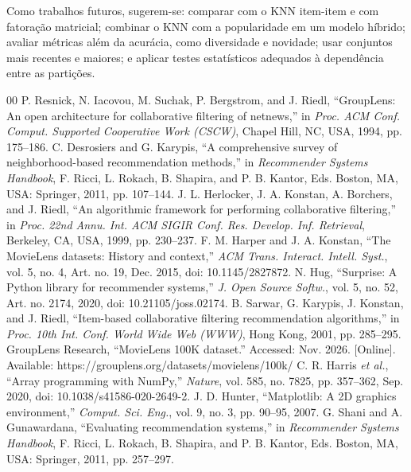 \documentclass[conference]{IEEEtran}
\begin{document}
Como trabalhos futuros, sugerem-se: comparar com o KNN item-item e com fatora\c{c}\~ao matricial; combinar o KNN com a popularidade em um modelo h\'ibrido; avaliar m\'etricas al\'em da acur\'acia, como diversidade e novidade; usar conjuntos mais recentes e maiores; e aplicar testes estat\'isticos adequados \`a depend\^encia entre as parti\c{c}\~oes.

\begin{thebibliography}{00}
 P. Resnick, N. Iacovou, M. Suchak, P. Bergstrom, and J. Riedl, ``GroupLens: An open architecture for collaborative filtering of netnews,'' in \textit{Proc. ACM Conf. Comput. Supported Cooperative Work (CSCW)}, Chapel Hill, NC, USA, 1994, pp. 175--186.
 C. Desrosiers and G. Karypis, ``A comprehensive survey of neighborhood-based recommendation methods,'' in \textit{Recommender Systems Handbook}, F. Ricci, L. Rokach, B. Shapira, and P. B. Kantor, Eds. Boston, MA, USA: Springer, 2011, pp. 107--144.
 J. L. Herlocker, J. A. Konstan, A. Borchers, and J. Riedl, ``An algorithmic framework for performing collaborative filtering,'' in \textit{Proc. 22nd Annu. Int. ACM SIGIR Conf. Res. Develop. Inf. Retrieval}, Berkeley, CA, USA, 1999, pp. 230--237.
 F. M. Harper and J. A. Konstan, ``The MovieLens datasets: History and context,'' \textit{ACM Trans. Interact. Intell. Syst.}, vol. 5, no. 4, Art. no. 19, Dec. 2015, doi: 10.1145/2827872.
 N. Hug, ``Surprise: A Python library for recommender systems,'' \textit{J. Open Source Softw.}, vol. 5, no. 52, Art. no. 2174, 2020, doi: 10.21105/joss.02174.
 B. Sarwar, G. Karypis, J. Konstan, and J. Riedl, ``Item-based collaborative filtering recommendation algorithms,'' in \textit{Proc. 10th Int. Conf. World Wide Web (WWW)}, Hong Kong, 2001, pp. 285--295.
 GroupLens Research, ``MovieLens 100K dataset.'' Accessed: Nov. 2026. [Online]. Available: https://grouplens.org/datasets/movielens/100k/
 C. R. Harris \textit{et al.}, ``Array programming with NumPy,'' \textit{Nature}, vol. 585, no. 7825, pp. 357--362, Sep. 2020, doi: 10.1038/s41586-020-2649-2.
 J. D. Hunter, ``Matplotlib: A 2D graphics environment,'' \textit{Comput. Sci. Eng.}, vol. 9, no. 3, pp. 90--95, 2007.
 G. Shani and A. Gunawardana, ``Evaluating recommendation systems,'' in \textit{Recommender Systems Handbook}, F. Ricci, L. Rokach, B. Shapira, and P. B. Kantor, Eds. Boston, MA, USA: Springer, 2011, pp. 257--297.
\end{thebibliography}
\end{document}
